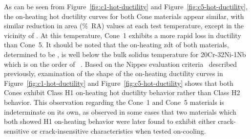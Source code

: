 {As can be seen from Figure~\ref{fig:c1-hot-ductility} and Figure~\ref{fig:c5-hot-ductility}, the on-heating hot ductility curves for both Cone materials appear similar, with similar reduction in area (\%~RA) values at each test temperature, except in the vicinity of .  At this temperature, Cone~1 exhibits a more rapid loss in ductility than Cone~5.  It should be noted that the on-heating \gls{zdt} of both materials, determined to be , is well below the bulk solidus temperature for 20Cr-32Ni-1Nb which is on the order of ~\cite{hoffman_high_2000-1}. Based on the Nippes evaluation criteria~\cite{nippes_further_1957} described previously, examination of the shape of the on-heating ductility curves in Figure~\ref{fig:c1-hot-ductility} and Figure~\ref{fig:c5-hot-ductility} shows that both Cones exhibit Class H1 on-heating hot ductility behavior rather than Class H2 behavior.  This observation regarding the Cone~1 and Cone~5 materials is indeterminate on its own, as \citet{nippes_further_1957} observed in some cases that two materials which both showed H1 on-heating behavior were later found to exhibit either crack-sensitive or crack-insensitive characteristics when tested on-cooling.

}
